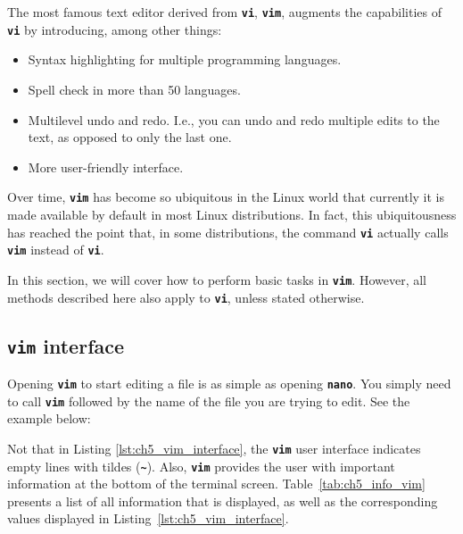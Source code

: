 The most famous text editor derived from \textbf{\texttt{vi}}, \textbf{\texttt{vim}}, augments the capabilities of \textbf{\texttt{vi}} by introducing, among other things:
\begin{itemize}
\item Syntax highlighting for multiple programming languages.
\item Spell check in more than 50 languages.
\item Multilevel undo and redo. I.e., you can undo and redo multiple edits to the text, as opposed to only the last one.
\item More user-friendly interface.
\end{itemize}

Over time, \textbf{\texttt{vim}} has become so ubiquitous in the Linux world that currently it is made available by default in most Linux distributions. In fact, this ubiquitousness has reached the point that, in some distributions, the command \textbf{\texttt{vi}} actually calls \textbf{\texttt{vim}} instead of \textbf{\texttt{vi}}.

In this section, we will cover how to perform basic tasks in \textbf{\texttt{vim}}. However, all methods described here also apply to \textbf{\texttt{vi}}, unless stated otherwise.

\subsection*{\textbf{\texttt{vim}} interface}

Opening \textbf{\texttt{vim}} to start editing a file is as simple as opening \textbf{\texttt{nano}}. You simply need to call \textbf{\texttt{vim}} followed by the name of the file you are trying to edit. See the example below:

Not that in Listing \ref{lst:ch5_vim_interface}, the \textbf{\texttt{vim}} user interface indicates empty lines with tildes (\textbf{\texttt{\textasciitilde}}). Also, \textbf{\texttt{vim}} provides the user with important information at the bottom of the terminal screen. Table~\ref{tab:ch5_info_vim} presents a list of all information that is displayed, as well as the corresponding values displayed in Listing~\ref{lst:ch5_vim_interface}.

